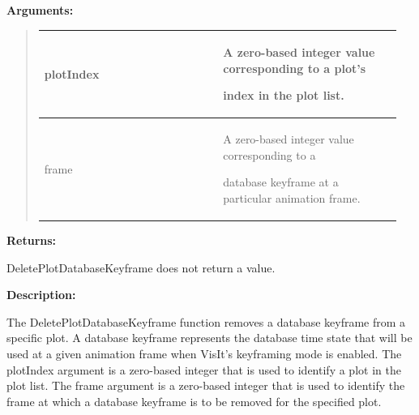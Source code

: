 \documentclass[letterpaper,10pt,english]{sphinxmanual}
\begin{document}
\begin{DUlineblock}{0em}
\item[] 
\item[] \textbf{Arguments:}
\end{DUlineblock}
\begin{quote}

\begin{tabular}{|p{0.475\linewidth}|p{0.475\linewidth}|}
\hline

plotIndex
 & 
\begin{DUlineblock}{0em}
\item[] A zero-based integer value corresponding to a plot's
\item[] index in the plot list.
\end{DUlineblock}
\\
\hline
frame
 & 
\begin{DUlineblock}{0em}
\item[] A zero-based integer value corresponding to a
\item[] database keyframe at a particular animation frame.
\end{DUlineblock}
\\
\hline\end{tabular}

\end{quote}

\begin{DUlineblock}{0em}
\item[] 
\item[] \textbf{Returns:}
\item[] DeletePlotDatabaseKeyframe does not return a value.
\item[] 
\item[] \textbf{Description:}
\item[] The DeletePlotDatabaseKeyframe function removes a database keyframe from a
specific plot. A database keyframe represents the database time state that
will be used at a given animation frame when VisIt's keyframing mode is
enabled. The plotIndex argument is a zero-based integer that is used to
identify a plot in the plot list. The frame argument is a zero-based
integer that is used to identify the frame at which a database keyframe is
to be removed for the specified plot.
\end{DUlineblock}

\begin{DUlineblock}{0em}
\item[] 
\end{DUlineblock}
\end{document}
